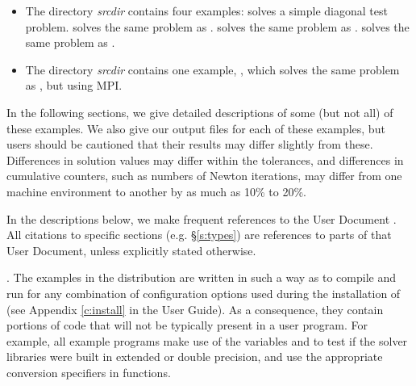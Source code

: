 \begin{itemize}

\item The directory {\em srcdir}
  contains four examples:
   solves a simple diagonal test problem.
   solves the same problem as .
   solves the same problem as
  .
   solves the same problem as .

\item The directory {\em srcdir}
contains one example, , which solves
the same problem as , but using MPI.
\end{itemize}


\vspace{0.2in}\noindent
In the following sections, we give detailed descriptions of some (but
not all) of these examples.  We also give our output files for
each of these examples, but users should be cautioned that their
results may differ slightly from these.  Differences in solution
values may differ within the tolerances, and differences in cumulative
counters, such as numbers of Newton iterations, may differ
from one machine environment to another by as much as 10\% to 20\%.

In the descriptions below, we make frequent references to the {\kinsol}
User Document \cite{kinsol_ug}.  All citations to specific sections
(e.g. \S\ref{s:types}) are references to parts of that User Document, unless
explicitly stated otherwise.

\vspace{0.2in}.
The examples in the {\kinsol} distribution are written in such a way as
to compile and run for any combination of configuration options used during
the installation of {\sundials} (see Appendix \ref{c:install} in the User Guide).
As a consequence, they contain portions of code that will not be typically present in a
user program. For example, all {\CC} example programs make use of the
variables  and 
to test if the solver libraries were built in extended or double precision,
and use the appropriate conversion specifiers in  functions.
